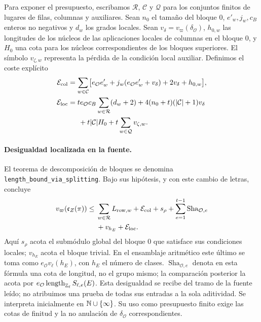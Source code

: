Para exponer el presupuesto, escribamos $\mathcal R$, $\mathcal C$
y $\mathcal Q$ para los conjuntos finitos de lugares de filas,
columnas y auxiliares. Sean $n_0$ el tamaño del bloque $0$,
$e'_w,j_w,c_B$ enteros no negativos y $d_w$ los grados locales.
Sean $v_\delta=v_\varpi(\delta_{\mathcal O})$,
$h_{0,w}$ las longitudes de los núcleos de las aplicaciones
locales de columnas en el bloque $0$, y $H_0$ una cota para los
núcleos correspondientes de los bloques superiores.
El símbolo $v_{\zeta,w}$ representa la pérdida de la condición
local auxiliar. Definimos el coste explícito
\begin{equation}
\begin{aligned}
 \mathcal E_{\rm col}
  &=\sum_{w\in\mathcal C}
    \bigl[e_{\mathcal O}e'_w
       +j_w(e_{\mathcal O}e'_w+v_\delta)
       +2v_\delta+h_{0,w}\bigr],\\
 \mathcal E_{\rm loc}
  &=t e_{\mathcal O}c_B\sum_{w\in\mathcal R}(d_w+2)
    +4(n_0+t)(|\mathcal C|+1)v_\delta\\
  &\hspace{1.5em}+t|\mathcal C|H_0
    +t\sum_{w\in\mathcal Q}v_{\zeta,w}.
\end{aligned}
\label{eq:ti-errores-explicitos}
\end{equation}

\paragraph{Desigualdad localizada en la fuente.}
El teorema de descomposición de bloques se denomina
\texttt{length\_bound\_via\_splitting}.
Bajo sus hipótesis, y con este cambio de letras, concluye
\begin{equation}
\begin{split}
 v_\varpi(\mathfrak c_Z(\pi))\le{}&
 \sum_{w\in\mathcal R}L_{{\rm row},w}
 +\mathcal E_{\rm col}+s_\rho
 +\sum_{e=1}^{t-1}\operatorname{Sha}_{\mathcal O,e}\\
 &+v_{h_E}+\mathcal E_{\rm loc}.
\end{split}
\label{eq:ti-local-display}
\end{equation}
Aquí $s_\rho$ acota el submódulo global del bloque $0$ que
satisface sus condiciones locales; $v_{h_E}$ acota el bloque
trivial. En el ensamblaje aritmético este último se toma como
$e_{\mathcal O}v_\ell(h_E)$, con $h_E$ el número de clases.
$\operatorname{Sha}_{\mathcal O,e}$ denota en esta fórmula una
cota de longitud, no el grupo mismo; la comparación posterior la
acota por $e_{\mathcal O}\operatorname{length}_{\mathbb{Z}_\ell}S_{\ell,e}(E)$.
Esta desigualdad se recibe del tramo de la fuente leído; no
atribuimos una prueba de todas sus entradas a la sola aditividad.
Se interpreta inicialmente en $\mathbb{N}\cup\{\infty\}$.
Su uso como presupuesto finito exige las cotas de finitud
y la no anulación de $\delta_{\mathcal O}$ correspondientes.

